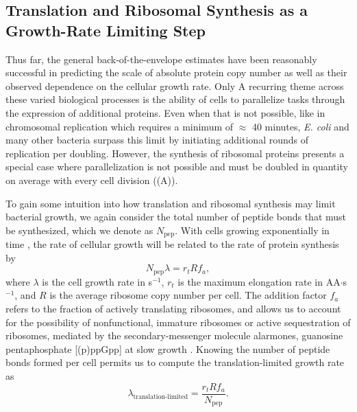 
\subsection{Translation and Ribosomal Synthesis as a Growth-Rate Limiting Step}
Thus far, the general back-of-the-envelope estimates have been reasonably
successful in predicting the scale of absolute protein copy number as well as
their observed dependence on the cellular growth rate. Only  A recurring theme
across these varied biological processes is the ability of cells to  parallelize
tasks through the expression of additional proteins.  Even when that is not
possible, like in chromosomal replication which  requires a minimum of $\approx$
40 minutes, \textit{E. coli} and many other bacteria surpass this limit by
initiating additional rounds of replication per doubling.
However, the synthesis of ribosomal proteins
presents a special case where parallelization is not possible and must be
doubled in quantity on average with every cell division
((A)).

To gain some intuition into how translation and ribosomal synthesis may limit
bacterial growth, we again consider the total number of peptide bonds that must
be synthesized, which we denote as $N_\text{pep}$. With cells growing exponentially in time
\citep{godin2010}, the rate of cellular growth will be related to the rate of protein synthesis by
\begin{equation}
    N_\text{pep} \lambda = r_t R f_a,
    \label{eq:mass_balance}
\end{equation}
where $\lambda$ is the cell growth rate in s$^{-1}$, $r_t$ is the maximum
elongation rate in AA$\cdot$s$^{-1}$, and $R$ is the average ribosome copy
number per cell. The addition factor $f_a$ refers to the fraction of actively
translating ribosomes, and allows us to account for the possibility of
nonfunctional, immature ribosomes or active sequestration of ribosomes, mediated
by the secondary-messenger molecule alarmones, guanosine pentaphosphate
[(p)ppGpp] at slow growth \citep{dennis2004, dai2016}. Knowing the number of
peptide bonds formed per cell permits us to compute the translation-limited growth
rate as
\begin{equation}
\lambda_\text{translation-limited} = \frac{r_t R f_a}{N_\text{pep}}.
\label{eq:lambda_limit}
\end{equation}

